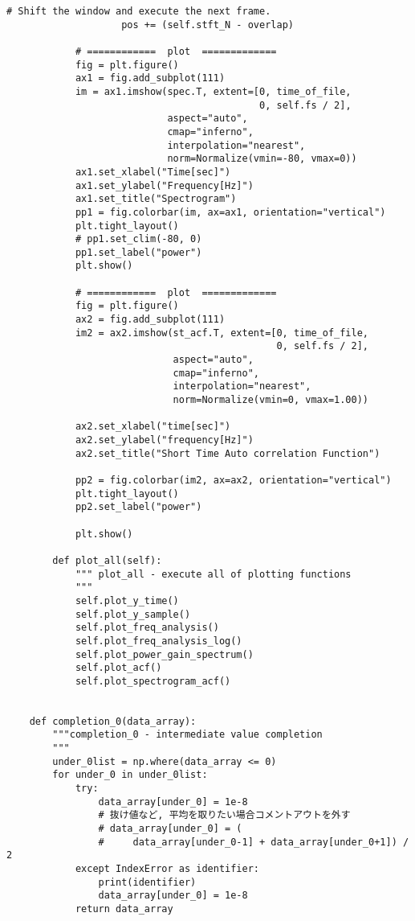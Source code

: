 \begin{lstlisting}[caption=plot\_tools.py,label=plot\_tools.py]
                    # Shift the window and execute the next frame.
                    pos += (self.stft_N - overlap)
    
            # ============  plot  =============
            fig = plt.figure()
            ax1 = fig.add_subplot(111)
            im = ax1.imshow(spec.T, extent=[0, time_of_file,
                                            0, self.fs / 2],
                            aspect="auto",
                            cmap="inferno",
                            interpolation="nearest",
                            norm=Normalize(vmin=-80, vmax=0))
            ax1.set_xlabel("Time[sec]")
            ax1.set_ylabel("Frequency[Hz]")
            ax1.set_title("Spectrogram")
            pp1 = fig.colorbar(im, ax=ax1, orientation="vertical")
            plt.tight_layout()
            # pp1.set_clim(-80, 0)
            pp1.set_label("power")
            plt.show()
    
            # ============  plot  =============
            fig = plt.figure()
            ax2 = fig.add_subplot(111)
            im2 = ax2.imshow(st_acf.T, extent=[0, time_of_file,
                                               0, self.fs / 2],
                             aspect="auto",
                             cmap="inferno",
                             interpolation="nearest",
                             norm=Normalize(vmin=0, vmax=1.00))
    
            ax2.set_xlabel("time[sec]")
            ax2.set_ylabel("frequency[Hz]")
            ax2.set_title("Short Time Auto correlation Function")
    
            pp2 = fig.colorbar(im2, ax=ax2, orientation="vertical")
            plt.tight_layout()
            pp2.set_label("power")
    
            plt.show()
    
        def plot_all(self):
            """ plot_all - execute all of plotting functions
            """
            self.plot_y_time()
            self.plot_y_sample()
            self.plot_freq_analysis()
            self.plot_freq_analysis_log()
            self.plot_power_gain_spectrum()
            self.plot_acf()
            self.plot_spectrogram_acf()
    
    
    def completion_0(data_array):
        """completion_0 - intermediate value completion
        """
        under_0list = np.where(data_array <= 0)
        for under_0 in under_0list:
            try:
                data_array[under_0] = 1e-8
                # 抜け値など, 平均を取りたい場合コメントアウトを外す
                # data_array[under_0] = (
                #     data_array[under_0-1] + data_array[under_0+1]) / 2
            except IndexError as identifier:
                print(identifier)
                data_array[under_0] = 1e-8
            return data_array
    

\end{lstlisting}
